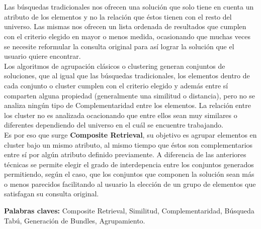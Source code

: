 \chapter*{\runtitulo}

\noindent Las búsquedas tradicionales nos ofrecen una solución que solo tiene en cuenta un atributo de los elementos y no la relación que éstos tienen con el resto del universo. Las mismas nos ofrecen un lista ordenada de resultados que cumplen con el criterio elegido en mayor o menos medida, ocasionando que muchas veces se necesite reformular la consulta original para así lograr la solución que el usuario quiere encontrar.\\
Los algoritmos de agrupación clásicos o clustering generan conjuntos de soluciones, que al igual que las búsquedas tradicionales, los elementos dentro de cada conjunto o cluster cumplen con el criterio elegido y además entre sí comparten alguna propiedad (generalmente una similitud o distancia), pero no se analiza ningún tipo de Complementaridad entre los elementos. La relación entre los cluster no es analizada ocacionando que entre ellos sean muy similares o diferentes dependiendo del universo en el cuál se encuentre trabajando.\\
Es por eso que surge \textbf{Composite Retrieval}, su objetivo es agrupar elementos en cluster bajo un mismo atributo, al mismo tiempo que éstos son complementarios entre sí por algún atributo definido previamente. A diferencia de las anteriores técnicas se permite elegir el grado de interdepencia entre los conjuntos generados permitiendo, según el caso, que los conjuntos que componen la solución sean más o menos parecidos facilitando al usuario la elección de un grupo de elementos que satisfagan su consulta original.

\bigskip

\noindent\textbf{Palabras claves:} Composite Retrieval, Similitud, Complementaridad, Búsqueda Tabú, Generación de Bundles, Agrupamiento.